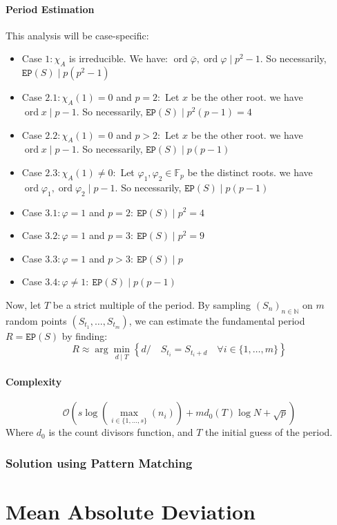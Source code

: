 \documentclass[]{article}
\DeclareMathOperator{\ord}{ord}
\begin{document}
\subsection{Period Estimation}
This analysis will be case-specific:
\begin{itemize}
	\item Case $1: \chi_A$ is irreducible. We have: $\ord \bar\varphi,\ord \varphi \mid p^2-1.$
	\newline
	So necessarily, $\mathtt{EP}(S) \mid p(p^2-1) $
	\item Case $2.1: \chi_A(1)=0$ and $p=2:$ Let $x$ be the other root.
	\newline we have $\ord x \mid p-1.$ So necessarily, $\mathtt{EP}(S) \mid p^2(p-1) = 4 $
	\item Case $2.2: \chi_A(1)=0$ and $p>2: $
	 Let $x$ be the other root. 
	 \newline 
	 we have $\ord x \mid p-1.$ So necessarily, $\mathtt{EP}(S) \mid p(p-1)$
	\item Case $2.3: \chi_A(1)\neq 0: $
	Let $\varphi_1,\varphi_2\in\mathbb{F}_p$ be the distinct roots.
	\newline
	we have $\ord \varphi_1,\ord \varphi_2 \mid p-1.$ So necessarily, $\mathtt{EP}(S) \mid p(p-1)$
	\item Case $3.1: \varphi = 1$ and $p=2: \ \mathtt{EP}(S) \mid p^2=4$
	\item Case $3.2: \varphi = 1$ and $p=3: \ \mathtt{EP}(S) \mid p^2=9$
	\item Case $3.3: \varphi = 1$ and $p>3: \ \mathtt{EP}(S) \mid p$
	\item Case $3.4: \varphi \neq 1: \ \mathtt{EP}(S) \mid p(p-1)$
\end{itemize}
Now, let $T$ be a strict multiple of the period. By sampling $(S_n)_{n\in\mathbb{N}}$ on $m$ random points $(S_{t_1},\dots,S_{t_m})$, we can estimate the fundamental period $R=\mathtt{EP}(S)$ by finding:
\begin{equation}\tag{2}
	\boxed{R\approx \arg\min_{d \mid T}\left\{d/\quad S_{t_i} = S_{t_i+d} \quad \forall i\in\{1,\dots,m\}\right\}}
\end{equation}
\subsection{Complexity}
$$
\mathcal{O}\left(s\log\left(\max_{i\in\{1,\dots,s\}}(n_{i})\right)+md_0(T)\log N + \sqrt p\right)
$$
Where $d_0$ is the count divisors function, and $T$ the initial guess of the period. 
\pagebreak
\section{Solution using Pattern Matching}
\pagebreak
\part{Mean Absolute Deviation}
\end{document}
